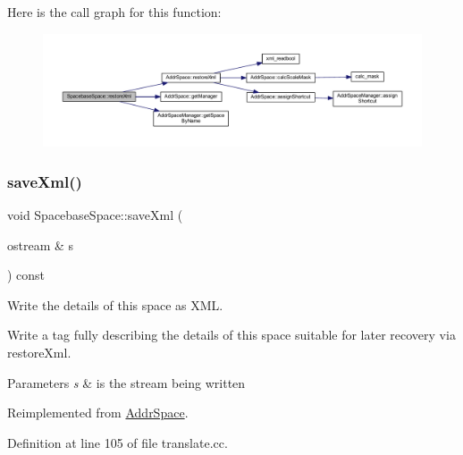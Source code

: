 Here is the call graph for this function\+:
\nopagebreak
\begin{figure}[H]
\begin{center}
\leavevmode
\includegraphics[width=350pt]{class_spacebase_space_adb45445a3286d78920f1c96074dd6229_cgraph}
\end{center}
\end{figure}
\mbox{\label{class_spacebase_space_ae98cc5d0f6f46274b1942aca597ce2ce}} 
\subsubsection{\texorpdfstring{saveXml()}{saveXml()}}
{\footnotesize\ttfamily void Spacebase\+Space\+::save\+Xml (\begin{DoxyParamCaption}\item[{ostream \&}]{s }\end{DoxyParamCaption}) const\hspace{0.3cm}{\ttfamily [virtual]}}



Write the details of this space as X\+ML. 

Write a tag fully describing the details of this space suitable for later recovery via restore\+Xml. 
\begin{DoxyParams}{Parameters}
{\em s} & is the stream being written \\
\hline
\end{DoxyParams}


Reimplemented from \mbox{\hyperlink{class_addr_space_ac073a4d446677c54d769abba01318864}{Addr\+Space}}.



Definition at line 105 of file translate.\+cc.


